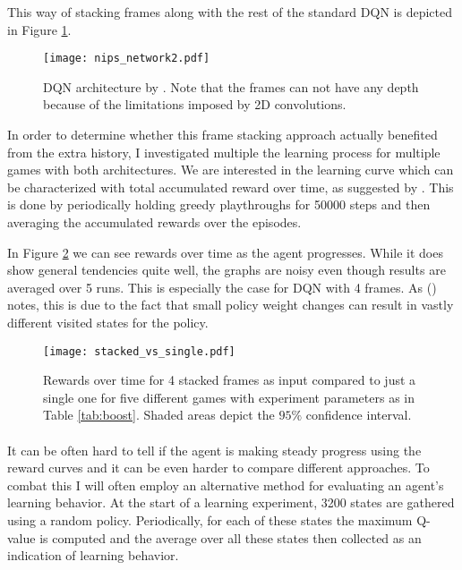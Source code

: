 This way of stacking frames along with the rest of the standard DQN
is depicted in Figure \ref{fig:nips_network2}.

\begin{figure}[htpb]
  \centering
  \texttt{[image: nips\_network2.pdf]}
  \caption{DQN architecture by \cite{Mnih2013}.
    Note that the frames can not have any depth because of
    the limitations imposed by 2D convolutions.
  }
  \label{fig:nips_network2}
\end{figure}

In order to determine
whether this frame stacking approach
actually benefited from the extra history,
I investigated multiple
the learning process for multiple games
with both architectures.
We are interested in the learning curve
which can be characterized with
total accumulated reward over time,
as suggested by \citeauthor{Bellemare2015} \citeyear{Bellemare2015}.
This is done by periodically
holding greedy playthroughs for 50000 steps
and then averaging the accumulated rewards
over the episodes.

In Figure \ref{fig:stacked_vs_single_rewards}
we can see rewards over time as the agent progresses.
While it does show general tendencies quite well,
the graphs are noisy even though results are averaged over 5 runs.
This is especially the case for DQN with 4 frames.
As \citeauthor{Mnih2013} (\citeyear{Mnih2013}) notes,
this is due to the fact that small policy weight changes
can result in vastly different visited states for the policy.

\begin{figure}[htpb]
  \centering
  \texttt{[image: stacked\_vs\_single.pdf]}
  \caption{
    Rewards over time for 4 stacked frames as input
    compared to just a single one
    for five different games
    with experiment parameters as in Table \ref{tab:boost}.
    Shaded areas depict the $95\%$ confidence interval.
  }
  \label{fig:stacked_vs_single_rewards}
\end{figure}

\paragraph{}
It can be often hard to tell if the agent is making steady progress
using the reward curves
and it can be even harder to compare different approaches.
To combat this I will often employ an alternative method
for evaluating an agent's learning behavior.
At the start of a learning experiment, 3200 states are gathered
using a random policy.
Periodically,
for each of these states the maximum Q-value is computed
and the average over all these states then collected
as an indication of learning behavior.

